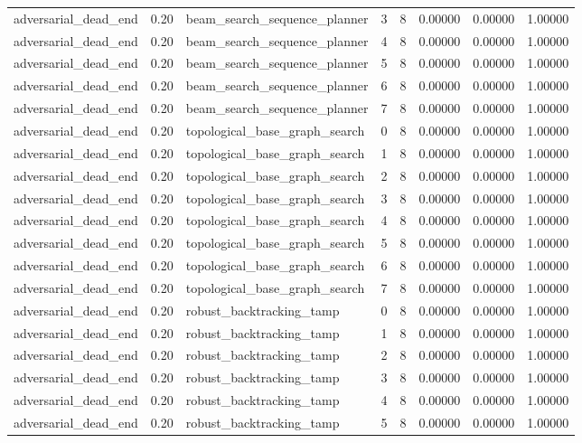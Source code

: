 \documentclass{article}
\begin{document}
\begin{table}[tbp]
{\begin{tabular}{llllllll}
adversarial\_dead\_end & 0.20 & beam\_search\_sequence\_planner & 3 & 8 & 0.00000 & 0.00000 & 1.00000 \\
adversarial\_dead\_end & 0.20 & beam\_search\_sequence\_planner & 4 & 8 & 0.00000 & 0.00000 & 1.00000 \\
adversarial\_dead\_end & 0.20 & beam\_search\_sequence\_planner & 5 & 8 & 0.00000 & 0.00000 & 1.00000 \\
adversarial\_dead\_end & 0.20 & beam\_search\_sequence\_planner & 6 & 8 & 0.00000 & 0.00000 & 1.00000 \\
adversarial\_dead\_end & 0.20 & beam\_search\_sequence\_planner & 7 & 8 & 0.00000 & 0.00000 & 1.00000 \\
adversarial\_dead\_end & 0.20 & topological\_base\_graph\_search & 0 & 8 & 0.00000 & 0.00000 & 1.00000 \\
adversarial\_dead\_end & 0.20 & topological\_base\_graph\_search & 1 & 8 & 0.00000 & 0.00000 & 1.00000 \\
adversarial\_dead\_end & 0.20 & topological\_base\_graph\_search & 2 & 8 & 0.00000 & 0.00000 & 1.00000 \\
adversarial\_dead\_end & 0.20 & topological\_base\_graph\_search & 3 & 8 & 0.00000 & 0.00000 & 1.00000 \\
adversarial\_dead\_end & 0.20 & topological\_base\_graph\_search & 4 & 8 & 0.00000 & 0.00000 & 1.00000 \\
adversarial\_dead\_end & 0.20 & topological\_base\_graph\_search & 5 & 8 & 0.00000 & 0.00000 & 1.00000 \\
adversarial\_dead\_end & 0.20 & topological\_base\_graph\_search & 6 & 8 & 0.00000 & 0.00000 & 1.00000 \\
adversarial\_dead\_end & 0.20 & topological\_base\_graph\_search & 7 & 8 & 0.00000 & 0.00000 & 1.00000 \\
adversarial\_dead\_end & 0.20 & robust\_backtracking\_tamp & 0 & 8 & 0.00000 & 0.00000 & 1.00000 \\
adversarial\_dead\_end & 0.20 & robust\_backtracking\_tamp & 1 & 8 & 0.00000 & 0.00000 & 1.00000 \\
adversarial\_dead\_end & 0.20 & robust\_backtracking\_tamp & 2 & 8 & 0.00000 & 0.00000 & 1.00000 \\
adversarial\_dead\_end & 0.20 & robust\_backtracking\_tamp & 3 & 8 & 0.00000 & 0.00000 & 1.00000 \\
adversarial\_dead\_end & 0.20 & robust\_backtracking\_tamp & 4 & 8 & 0.00000 & 0.00000 & 1.00000 \\
adversarial\_dead\_end & 0.20 & robust\_backtracking\_tamp & 5 & 8 & 0.00000 & 0.00000 & 1.00000 \\
\bottomrule
\end{tabular}
}
\end{table}
\end{document}
